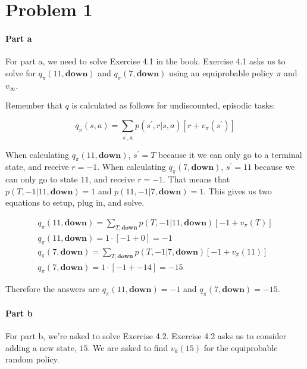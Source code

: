 \documentclass[12pt]{article}
\begin{document}
\maketitle

\section{Problem 1}

\paragraph{Part a} For part a, we need to solve Exercise 4.1 in the book. Exercise 4.1 asks us to solve for $q_\pi(11, \textbf{down})$ and $q_\pi(7, \textbf{down})$ using an equiprobable policy $\pi$ and $v_\infty$.

Remember that $q$ is calculated as follows for undiscounted, episodic tasks:

$$
  q_\pi(s, a) = \sum_{s^\prime, a} p(s^\prime, r | s, a)[r + v_\pi(s^\prime)]
$$

When calculating $q_\pi(11, \textbf{down})$, $s^\prime = T$ because it we can only go to a terminal state, and receive $r = -1$.
When calculating $q_\pi(7, \textbf{down})$, $s^\prime = 11$ because we can only go to state $11$, and receive $r = -1$.
That means that $p(T, -1 | 11, \textbf{down}) = 1$ and $p(11, -1 | 7, \textbf{down}) = 1$.
This gives us two equations to setup, plug in, and solve.



\begin{gather*}
  q_\pi(11, \textbf{down}) = \sum_{T, \textbf{down}} p(T, -1 | 11, \textbf{down}) [-1 + v_\pi(T)] \\
  q_\pi(11, \textbf{down}) = 1 \cdot [-1 + 0] = -1 \\
  q_\pi(7, \textbf{down}) = \sum_{T, \textbf{down}} p(T, -1 | 7, \textbf{down}) [-1 + v_\pi(11)] \\
  q_\pi(7, \textbf{down}) = 1 \cdot [-1 + -14] = -15
\end{gather*}

Therefore the answers are $q_\pi(11, \textbf{down}) = -1$ and $q_\pi(7, \textbf{down}) = -15$.

\paragraph{Part b} For part b, we're asked to solve Exercise 4.2. Exercise 4.2 asks us to consider adding a new state, $15$. We are asked to find $v_k(15)$ for the equiprobable random policy.
\end{document}
